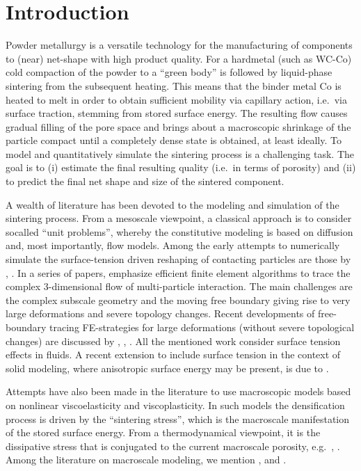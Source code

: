 \documentclass[12pt,a4paper,fleqn]{article}
\begin{document}
\section{Introduction}
Powder metallurgy is a versatile technology for the manufacturing of components to (near) net-shape with high product quality.
For a hardmetal (such as WC-Co) cold compaction of the powder to a ``green body'' is followed by liquid-phase sintering from the subsequent heating.
This means that the binder metal Co is heated to melt in order to obtain sufficient mobility via capillary action, i.e.\ via surface traction, stemming from stored surface energy.
The resulting flow causes gradual filling of the pore space and brings about a macroscopic shrinkage of the particle compact until a completely dense state is obtained, at least ideally.
To model and quantitatively simulate the sintering process is a challenging task.
The goal is to (i) estimate the final resulting quality (i.e.\ in terms of porosity) and (ii) to predict the final net shape and size of the sintered component.

A wealth of literature has been devoted to the modeling and simulation of the sintering process.
From a mesoscale viewpoint, a classical approach is to consider socalled ``unit problems'', whereby the constitutive modeling is based on diffusion and, most importantly, flow models.
Among the early attempts to numerically simulate the surface-tension driven reshaping of contacting particles are those by \cite{JagDaw1988a,JagDaw1988b}, \cite{Vorst1993}.
In a series of papers, \cite{ZhoDer1998,ZhoDer2001} emphasize efficient finite element algorithms to trace the complex 3-dimensional flow of multi-particle interaction.
The main challenges  are the complex subscale geometry and the moving free boundary giving rise to very large deformations and severe topology changes.
Recent developments of free-boundary tracing FE-strategies for large deformations (without severe topological changes) are discussed by \cite{DetPer2006}, \cite{SakPer2006a}, \cite{SakPer2006b}.
All the mentioned work consider surface tension effects in fluids.
A recent extension to include surface tension in the context of solid modeling, where anisotropic surface energy may be present, is due to \cite{JavSte2009:2d,JavSte2010:3d}.

Attempts have also been made in the literature to use macroscopic models based on nonlinear viscoelasticity and viscoplasticity.
In such models the densification process is driven by the ``sintering stress'', which is the macroscale manifestation of the stored surface energy.
From a thermodynamical viewpoint, it is the dissipative stress that is conjugated to the current macroscale porosity, e.g.\ \cite{ReiOak1990}, \cite{MahRun2000}.
Among the literature on macroscale modeling, we mention \cite{Svoetal1996}, \cite{XuMeh1997} and \cite{Luetal2001:porosity}.
\end{document}
